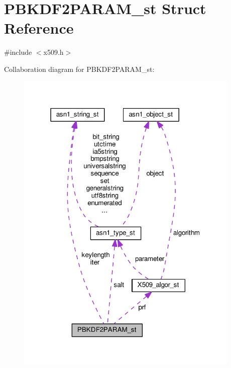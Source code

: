 \hypertarget{struct_p_b_k_d_f2_p_a_r_a_m__st}{}\section{P\+B\+K\+D\+F2\+P\+A\+R\+A\+M\+\_\+st Struct Reference}
\label{struct_p_b_k_d_f2_p_a_r_a_m__st}


{\ttfamily \#include $<$x509.\+h$>$}



Collaboration diagram for P\+B\+K\+D\+F2\+P\+A\+R\+A\+M\+\_\+st\+:
\nopagebreak
\begin{figure}[H]
\begin{center}
\leavevmode
\includegraphics[width=303pt]{struct_p_b_k_d_f2_p_a_r_a_m__st__coll__graph}
\end{center}
\end{figure}

